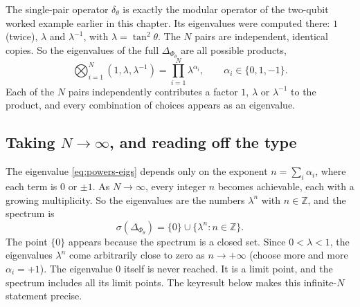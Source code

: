 The single-pair operator $\delta_\theta$ is exactly the modular operator of the two-qubit worked example
earlier in this chapter. Its eigenvalues were computed there: $1$ (twice), $\lambda$ and $\lambda^{-1}$, with
$\lambda=\tan^2\theta$. The $N$ pairs are independent, identical copies. So the eigenvalues of the full
$\Delta_{\Phi_\theta}$ are all possible products,
\begin{equation}
\bigotimes_{i=1}^N(1,\lambda,\lambda^{-1}) = \prod_{i=1}^N\lambda^{\alpha_i}, \qquad \alpha_i\in\{0,1,-1\} .
\label{eq:powers-eigs}
\end{equation}
Each of the $N$ pairs independently contributes a factor $1$, $\lambda$ or $\lambda^{-1}$ to the product, and
every combination of choices appears as an eigenvalue.

\subsection*{Taking $N\to\infty$, and reading off the type}

The eigenvalue \eqref{eq:powers-eigs} depends only on the exponent $n=\sum_i\alpha_i$, where each term is $0$
or $\pm1$. As $N\to\infty$, every integer $n$ becomes achievable, each with a growing multiplicity. So the
eigenvalues are the numbers $\lambda^n$ with $n\in\mathbb Z$, and the spectrum is
\begin{equation}
\sigma(\Delta_{\Phi_\theta}) = \{0\}\cup\{\lambda^n : n\in\mathbb Z\} .
\label{eq:powers-spec}
\end{equation}
The point $\{0\}$ appears because the spectrum is a closed set. Since $0<\lambda<1$, the eigenvalues $\lambda^n$
come arbitrarily close to zero as $n\to+\infty$ (choose more and more $\alpha_i=+1$). The eigenvalue $0$
itself is never reached. It is a limit point, and the spectrum includes all its limit points. The keyresult
below makes this infinite-$N$ statement precise.


